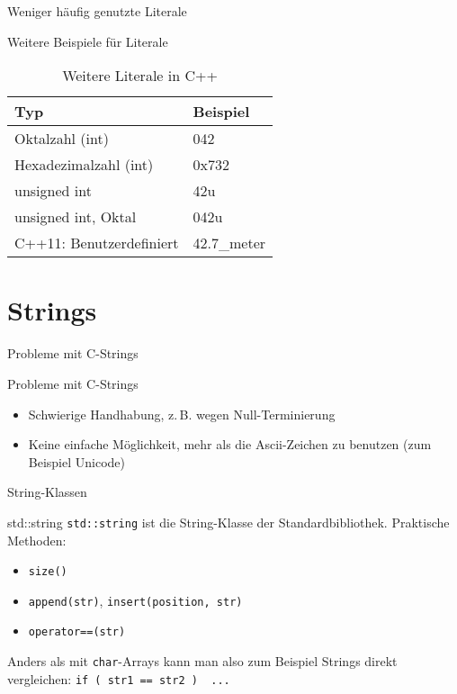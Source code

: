 \begin{frame}{Weniger häufig genutzte Literale}
    \begin{block}{Weitere Beispiele für Literale}
        \begin{table}
        \center
        \begin{tabular}{ll}
            \toprule
            Typ & Beispiel \\
            \midrule
            Oktalzahl (int) & 042 \\
            Hexadezimalzahl (int) & 0x732 \\
            \midrule
            \pause
            unsigned int & 42u \\
            unsigned int, Oktal & 042u \\
            \midrule
            \pause
            C++11: Benutzerdefiniert & 42.7\_meter \\
            \bottomrule
        \end{tabular}
        \caption{Weitere Literale in C++}
        \end{table}
    \end{block}
\end{frame}

\section{Strings}

\begin{frame}{Probleme mit C-Strings}
    \begin{block}{Probleme mit C-Strings}
    \begin{itemize}
    \item Schwierige Handhabung, z.\,B. wegen Null-Terminierung
    \item Keine einfache Möglichkeit, mehr als die Ascii-Zeichen zu benutzen (zum Beispiel Unicode)
    \end{itemize}
    \end{block}
\end{frame}

\begin{frame}{String-Klassen}
    \begin{block}{std::string}
    \texttt{std::string} ist die String-Klasse der Standardbibliothek. Praktische Methoden:
    \begin{itemize}
    \item \texttt{size()}
    \item \texttt{append(str)}, \texttt{insert(position, str)}
    \item \texttt{operator==(str)}
    \end{itemize}
    Anders als mit \texttt{char}-Arrays kann man also zum Beispiel Strings direkt vergleichen:
    \texttt{if ( str1 == str2 ) { ... }}
    \end{block}
\end{frame}

